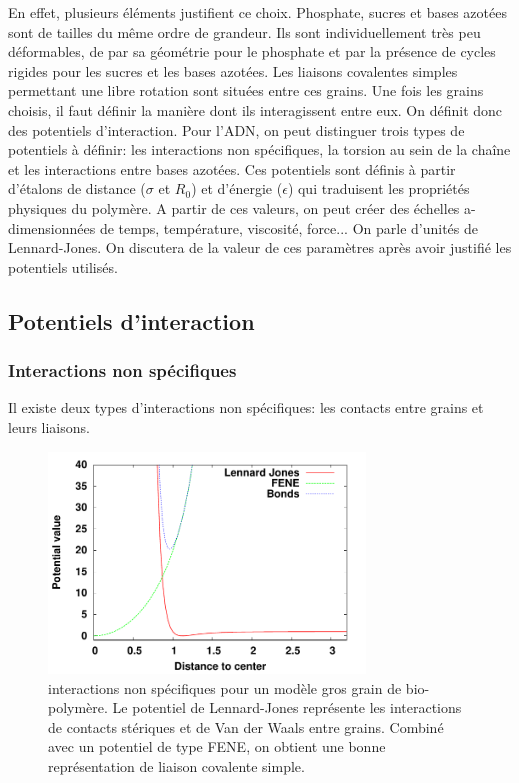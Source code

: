 En effet, plusieurs éléments justifient ce choix. Phosphate, sucres et bases azotées sont de tailles du même ordre de grandeur. Ils sont individuellement très peu déformables, de par sa géométrie pour le phosphate et par la présence de cycles rigides pour les sucres et les bases azotées. Les liaisons covalentes simples permettant une libre rotation sont situées entre ces grains. Une fois les grains choisis, il faut définir la manière dont ils interagissent entre eux. On définit donc des potentiels d’interaction. Pour l'ADN, on peut distinguer trois types de potentiels à définir: les interactions non spécifiques, la torsion au sein de la chaîne et les interactions entre bases azotées. Ces potentiels sont définis à partir d'étalons de distance ($\sigma$ et $R_0$) et d'énergie ($\epsilon$) qui traduisent les propriétés physiques du polymère. A partir de ces valeurs, on peut créer des échelles a-dimensionnées de temps, température, viscosité, force... On parle d'unités de Lennard-Jones. On discutera de la valeur de ces paramètres après avoir justifié les potentiels utilisés.


\subsection{Potentiels d'interaction}

\subsubsection{Interactions non spécifiques}

Il existe deux types d'interactions non spécifiques: les contacts entre grains et leurs liaisons. 

\begin{figure}[H]
\begin{center}
\includegraphics[width=0.75\textwidth]{nonspec.pdf}

\caption[Potentiels stériques]{interactions non spécifiques pour un modèle gros grain de bio-polymère. Le potentiel de Lennard-Jones représente les interactions de contacts stériques et de Van der Waals entre grains. Combiné avec un potentiel de type FENE, on obtient une bonne représentation de liaison covalente simple.}
\label{nonspecificinterac}
\end{center}
\end{figure}


